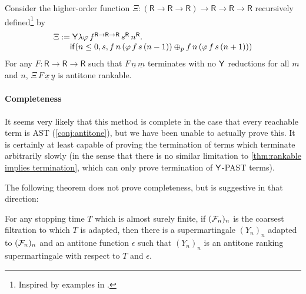 \begin{example} \label{ex:higher-order recursion}
Consider the higher-order function
$\Xi : (\textsf{R} \to \textsf{R} \to \textsf{R}) \to \textsf{R} \to \textsf{R} \to \textsf{R}$
recursively defined\footnote{Inspired by examples in \cite{DBLP:journals/pacmpl/BurnOR18,DBLP:conf/lics/OngW19}.} by
\[
\begin{array}{l}
\Xi := \mathsf{Y} \lambda \varphi \, f^{\textsf{R} \to \textsf{R} \to \textsf{R}} \, s^\textsf{R} \, n^\textsf{R} . \\
\qquad\mathsf{if}(n \leq 0, s, 
f \, n \, (\varphi \, f \, s \, (n - 1))
\oplus_p
f \, n \, (\varphi \, f \, s \, (n + 1))
)
\end{array}
\]
For any $F : \textsf{R} \to \textsf{R} \to \textsf{R}$ such that $F\, \underline n\, \underline m$ terminates with no $\mathsf{Y}$ reductions for all $m$ and $n$, $\Xi\, F\, \underline x\, \underline y$ is antitone rankable.
\end{example}

\paragraph*{Completeness}
It seems very likely that this method is complete in the case that every reachable term is AST (\cref{conj:antitone}), but we have been unable to actually prove this. It is certainly at least capable of proving the termination of terms which terminate arbitrarily slowly (in the sense that there is no similar limitation to \cref{thm:rankable implies termination}, which can only prove termination of $\mathsf{Y}$-PAST terms).

The following theorem does not prove completeness, but is suggestive in that direction:
\begin{theorem}
\label{thm:towards completeness}
For any stopping time $T$ which is almost surely finite, if $(\mathcal{F}_n)_n$ is the coarsest filtration to which $T$ is adapted, then there is a supermartingale $(Y_n)_n$ adapted to $(\mathcal{F}_n)_n$ and an antitone function $\epsilon$ such that $(Y_n)_n$ is an antitone ranking supermartingale with respect to $T$ and $\epsilon$.
\end{theorem}


